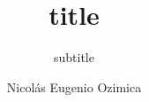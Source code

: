 \documentclass[12pt,xcolor={dvipsnames,x11names},t]{beamer}
\title{title}
\subtitle{subtitle}
\author{Nicolás Eugenio Ozimica}
\date{}
\begin{document}
\begin{frame}[plain]
    \vspace{6mm}
    \centering
    \vspace{6mm}
\titlepage
\end{frame}


\end{document}
